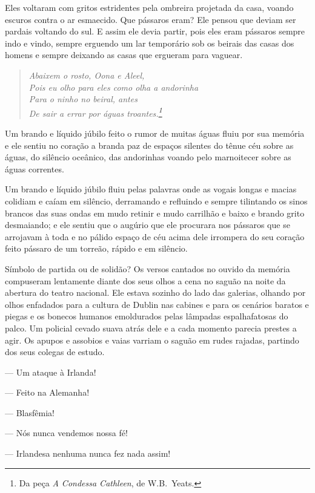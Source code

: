 Eles voltaram com gritos estridentes pela ombreira projetada da casa,
voando escuros contra o ar esmaecido. Que pássaros eram? Ele pensou que
deviam ser pardais voltando do sul. E assim ele devia partir, pois eles
eram pássaros sempre indo e vindo, sempre erguendo um lar temporário
sob os beirais das casas dos homens e sempre deixando as casas que
ergueram para vaguear.

\begin{verse}\itshape
Abaixem o rosto, Oona e Aleel,\\
Pois eu olho para eles como olha a andorinha\\
Para o ninho no beiral, antes\\
De sair a errar por águas troantes.\footnote{ Da peça \textit{A
Condessa Cathleen}, de W.B.~Yeats.}
\end{verse}

Um brando e líquido júbilo feito o rumor de muitas águas fluiu por sua
memória e ele sentiu no coração a branda paz de espaços silentes do
tênue céu sobre as águas, do silêncio oceânico, das andorinhas voando
pelo marnoitecer sobre as águas correntes.                           

Um brando e líquido júbilo fluiu pelas palavras onde as vogais longas e
macias colidiam e caíam em silêncio, derramando e refluindo e sempre
tilintando os sinos brancos das suas ondas em mudo retinir e mudo
carrilhão e baixo e brando grito desmaiando; e ele sentiu que o augúrio
que ele procurara nos pássaros que se arrojavam à toda e no pálido
espaço de céu acima dele irrompera do seu coração feito pássaro de um
torreão, rápido e em silêncio.

Símbolo de partida ou de solidão? Os versos cantados no ouvido da
memória compuseram lentamente diante dos seus olhos a cena no saguão na
noite da abertura do teatro nacional. Ele estava sozinho do lado das
galerias, olhando por olhos enfadados para a cultura de Dublin nas
cabines e para os cenários baratos e piegas e os bonecos humanos
emoldurados pelas lâmpadas espalhafatosas do palco. Um policial cevado
suava atrás dele e a cada momento parecia prestes a agir. Os apupos e
assobios e vaias varriam o saguão em rudes rajadas, partindo dos seus
colegas de estudo.

 --- Um ataque à Irlanda!

 --- Feito na Alemanha!

 --- Blasfêmia!

 --- Nós nunca vendemos nossa fé!

 --- Irlandesa nenhuma nunca fez nada assim!

